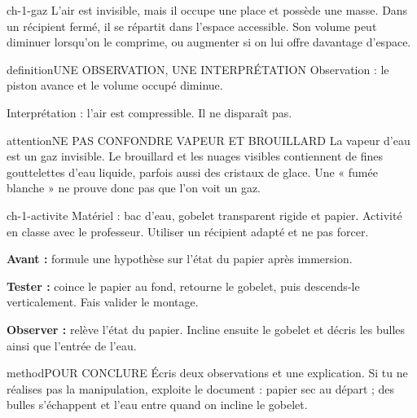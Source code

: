 \documentclass[12pt,twoside,openany]{book}
\begin{document}
\label{ch-1-gaz}
\begin{pcFiche}{ch-1-gaz}
L’air est invisible, mais il occupe une place et possède une masse. Dans un récipient fermé, il se répartit dans l’espace accessible. Son volume peut diminuer lorsqu’on le comprime, ou augmenter si on lui offre davantage d’espace.\par
{}
\begin{pcEncadre}{definition}{UNE OBSERVATION, UNE INTERPRÉTATION}
Observation : le piston avance et le volume occupé diminue.\par Interprétation : l’air est compressible. Il ne disparaît pas.\par
\end{pcEncadre}
\begin{pcEncadre}{attention}{NE PAS CONFONDRE VAPEUR ET BROUILLARD}
La vapeur d’eau est un gaz invisible. Le brouillard et les nuages visibles contiennent de fines gouttelettes d’eau liquide, parfois aussi des cristaux de glace. Une « fumée blanche » ne prouve donc pas que l’on voit un gaz.\par
\end{pcEncadre}
\end{pcFiche}
\label{ch-1-activite}
\begin{pcFiche}{ch-1-activite}
Matériel : bac d’eau, gobelet transparent rigide et papier. Activité en classe avec le professeur. Utiliser un récipient adapté et ne pas forcer.\par
{}
\begin{questions}
\item \textbf{Avant :} formule une hypothèse sur l’état du papier après immersion.
\item \textbf{Tester :} coince le papier au fond, retourne le gobelet, puis descends-le verticalement. Fais valider le montage.
\item \textbf{Observer :} relève l’état du papier. Incline ensuite le gobelet et décris les bulles ainsi que l’entrée de l’eau.
\end{questions}
\begin{pcEncadre}{method}{POUR CONCLURE}
Écris deux observations et une explication. Si tu ne réalises pas la manipulation, exploite le document : papier sec au départ ; des bulles s’échappent et l’eau entre quand on incline le gobelet.\par
\end{pcEncadre}
\end{pcFiche}
\end{document}
